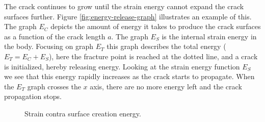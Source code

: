 


The crack continues to grow until the strain energy cannot expand 
the crack surfaces further. Figure \vref{fig:energy-release-graph}
illustrates an example of this.
%
The graph $E_C$ depicts the amount of energy it takes to produce the
crack surfaces as a function of the crack length $a$. 
%
%
The graph $E_S$ is the internal strain energy in the body.
%
Focusing on graph $E_T$ this graph describes the total
energy ($E_T = E_C + E_S$), here the fracture point is reached
at the dotted line, and a crack is initialized, hereby releasing
energy.
%
Looking at the strain energy function $E_S$ we see that this energy
rapidly increases as the crack starts to propagate.
%
When the $E_T$ graph crosses the $x$ axis, there are no more energy
left and the crack propagation stops.

\begin{figure}
  \centering
  \qquad
  \caption{Strain contra surface creation energy.}
  \label{fig:energy-graphs}
\end{figure}


